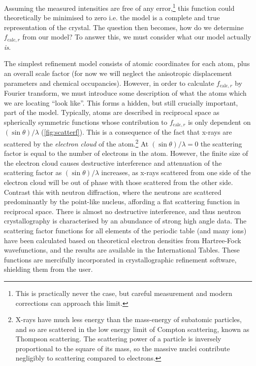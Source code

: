 \begin{refsection}
Assuming the measured intensities are free of any error,\footnote{This is practically never the case, but careful measurement and modern corrections can approach this limit.} this function could theoretically be minimised to zero i.e. the model is a complete and true representation of the crystal.
The question then becomes, how do we determine $f_{\mathrm{calc}, r}$ from our model?
To answer this, we must consider what our model actually \emph{is}.

The simplest refinement model consists of atomic coordinates for each atom, plus an overall scale factor (for now we will neglect the anisotropic displacement parameters and chemical occupancies).
However, in order to calculate $f_{\mathrm{calc}, r}$ by Fourier transform, we must introduce some description of what the atoms which we are locating ``look like''.
This forms a hidden, but still crucially important, part of the model.
Typically, atoms are described in reciprocal space as spherically symmetric functions whose contribution to $f_{\mathrm{calc}, r}$ is only dependent on $(\sin\theta)/\lambda$ (\cref{fig:scatterf}).
This is a consequence of the fact that x-rays are scattered by the \emph{electron cloud} of the atom.\footnote{X-rays have much less energy than the mass-energy of subatomic particles, and so are scattered in the low energy limit of Compton scattering, known as Thompson scattering.
The scattering power of a particle is inversely proportional to the square of its mass, so the massive nuclei contribute negligibly to scattering compared to electrons.}
At $(\sin\theta)/\lambda = 0$ the scattering factor is equal to the number of electrons in the atom.
However, the finite size of the electron cloud causes destructive interference and attenuation of the scattering factor as $(\sin\theta)/\lambda$ increases, as x-rays scattered from one side of the electron cloud will be out of phase with those scattered from the other side.
Contrast this with neutron diffraction, where the neutrons are scattered predominantly by the point-like nucleus, affording a flat scattering function in reciprocal space.
There is almost no destructive interference, and thus neutron crystallography is characterised by an abundance of strong high angle data.
The scattering factor functions for all elements of the periodic table (and many ions) have been calculated based on theoretical electron densities from Hartree-Fock wavefunctions, and the results are available in the International Tables.\autocite{IntTabCIntensityofdiffractedintensities}
These functions are mercifully incorporated in crystallographic refinement software, shielding them from the user.


\end{refsection}
